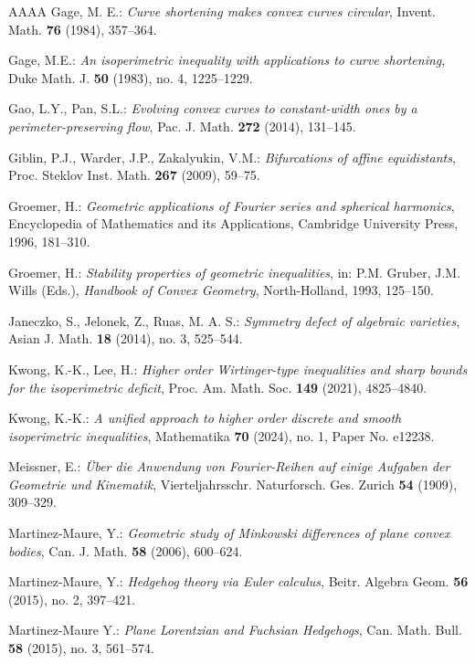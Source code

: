 \documentclass{amsart}
\theoremstyle{definition}
\numberwithin{equation}{section}
\begin{document}
\begin{thebibliography}{AAAA}
 Gage, M. E.: \emph{Curve shortening makes convex curves circular}, Invent. Math. \textbf{76} (1984), 357--364.

 Gage, M.E.: \emph{An isoperimetric inequality with applications to curve shortening}, Duke Math. J. \textbf{50} (1983), no. 4, 1225--1229.

 Gao, L.Y., Pan, S.L.: \emph{Evolving convex curves to constant-width ones by a perimeter-preserving flow}, Pac. J. Math. \textbf{272} (2014), 131--145.

 Giblin, P.J., Warder, J.P., Zakalyukin, V.M.: \emph{Bifurcations of affine equidistants}, Proc. Steklov Inst. Math. \textbf{267} (2009), 59--75.

 Groemer, H.: \emph{Geometric applications of Fourier series and spherical harmonics}, Encyclopedia of Mathematics and its Applications, Cambridge University Press, 1996, 181--310.

 Groemer, H.: \emph{Stability properties of geometric inequalities}, in: P.M. Gruber, J.M. Wills (Eds.), \emph{Handbook of Convex Geometry}, North-Holland, 1993, 125--150.

 Janeczko, S., Jelonek, Z., Ruas, M. A. S.: \emph{Symmetry defect of algebraic varieties}, Asian J. Math. \textbf{18} (2014), no. 3, 525--544.

 Kwong, K.-K., Lee, H.: \emph{Higher order Wirtinger-type inequalities and sharp bounds for the isoperimetric deficit}, Proc. Am. Math. Soc. \textbf{149} (2021), 4825--4840.

 Kwong, K.-K.: \emph{A unified approach to higher order discrete and smooth isoperimetric inequalities}, Mathematika \textbf{70} (2024), no. 1, Paper No. e12238.

 Meissner, E.: \emph{Über die Anwendung von Fourier-Reihen auf einige Aufgaben der Geometrie und Kinematik}, Vierteljahrsschr. Naturforsch. Ges. Zurich \textbf{54} (1909), 309--329.

 Martinez-Maure, Y.: \emph{Geometric study of Minkowski differences of plane convex bodies}, Can. J. Math. \textbf{58} (2006), 600--624.

 Martinez-Maure, Y.: \emph{Hedgehog theory via Euler calculus}, Beitr. Algebra Geom. \textbf{56} (2015), no. 2, 397--421.

 Martinez-Maure Y.: \emph{Plane Lorentzian and Fuchsian Hedgehogs}, Can. Math. Bull. \textbf{58} (2015), no. 3, 561--574.


\end{thebibliography}
\end{document}
